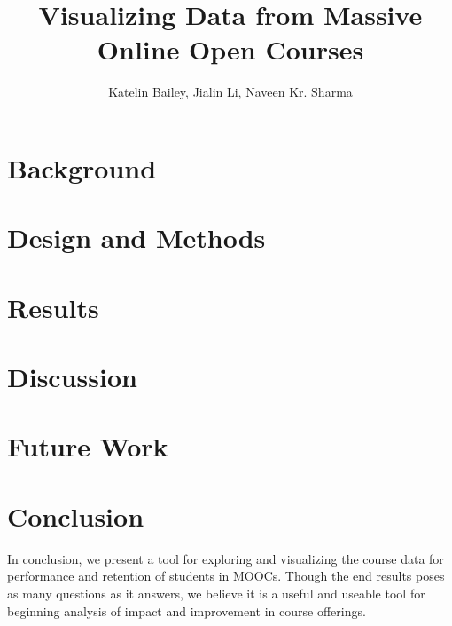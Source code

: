 \documentclass[journal]{vgtc}                %
\title{Visualizing Data from Massive Online Open Courses}
\author{Katelin Bailey, Jialin Li, Naveen Kr. Sharma}
\begin{document}
\maketitle

	
\section{Background}
	
\section{Design and Methods}
	
\section{Results}
	
\section{Discussion}
	
\section{Future Work}
	
\section{Conclusion}
	In conclusion, we present a tool for exploring and visualizing the course data for performance and retention of students in MOOCs. Though the end results poses as many questions as it answers, we believe it is a useful and useable tool for beginning analysis of impact and improvement in course offerings. 


%
%
%



%


\end{document}
